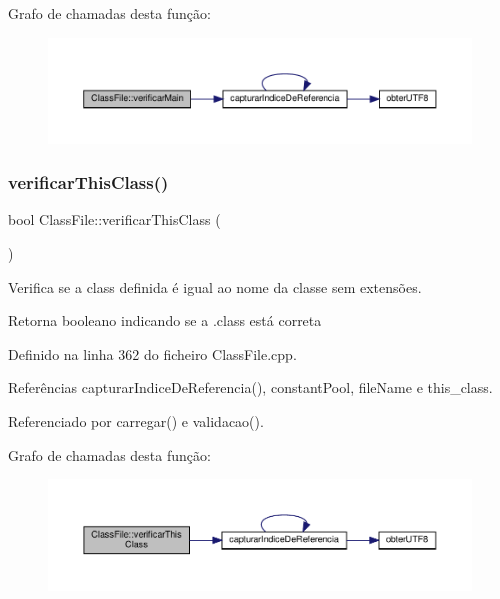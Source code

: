 Grafo de chamadas desta função\+:\nopagebreak
\begin{figure}[H]
\begin{center}
\leavevmode
\includegraphics[width=350pt]{classClassFile_ae8e4445e763c4ee7c04995fcea0369e0_cgraph}
\end{center}
\end{figure}
\mbox{\label{classClassFile_a6b8f23db0ee4af80a2e75d46a191dc20}} 
\subsubsection{\texorpdfstring{verificar\+This\+Class()}{verificarThisClass()}}
{\footnotesize\ttfamily bool Class\+File\+::verificar\+This\+Class (\begin{DoxyParamCaption}{ }\end{DoxyParamCaption})}



Verifica se a class definida é igual ao nome da classe sem extensões. 

\begin{DoxyReturn}{Retorna}
booleano indicando se a .class está correta 
\end{DoxyReturn}


Definido na linha 362 do ficheiro Class\+File.\+cpp.



Referências capturar\+Indice\+De\+Referencia(), constant\+Pool, file\+Name e this\+\_\+class.



Referenciado por carregar() e validacao().

Grafo de chamadas desta função\+:\nopagebreak
\begin{figure}[H]
\begin{center}
\leavevmode
\includegraphics[width=350pt]{classClassFile_a6b8f23db0ee4af80a2e75d46a191dc20_cgraph}
\end{center}
\end{figure}


